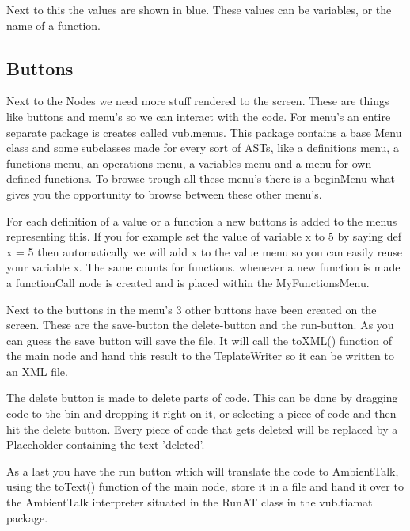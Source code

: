 \documentclass[a4paper,12pt]{report}
\begin{document}
Next to this the values are shown in blue. These values can be variables, or the name of a function.

\subsection{Buttons}
Next to the Nodes we need more stuff rendered to the screen. These are things like buttons and menu's so we can interact with the code. For menu's an entire separate package is creates called vub.menus. This package contains a 
base Menu class and some subclasses made for every sort of ASTs, like a definitions menu, a functions menu, an operations menu, a variables menu and a menu for own defined functions. To browse trough all these menu's there is 
a beginMenu what gives you the opportunity to browse between these other menu's.

For each definition of a value or a function a new buttons is added to the menus representing this. If you for example set the value of variable x to 5 by saying def x = 5 then automatically we will add x to
the value menu so you can easily reuse your variable x. The same counts for functions. whenever a new function is made a functionCall node is created and is placed within the MyFunctionsMenu.

Next to the buttons in the menu's 3 other buttons have been created on the screen. These are the save-button the delete-button and the run-button. As you can guess the save button will save the file. It will call the 
toXML() function of the main node and hand this result to the TeplateWriter so it can be written to an XML file.

The delete button is made to delete parts of code. This can be done by dragging code to the bin and dropping it right on it, or selecting a piece of code and then hit the delete button. Every piece of code that gets 
deleted will be replaced by a Placeholder containing the text 'deleted'.

As a last you have the run button which will translate the code to AmbientTalk, using the toText() function of the main node, store it in a file and hand it over to the AmbientTalk interpreter situated in the RunAT class in the 
vub.tiamat package.
\end{document}

